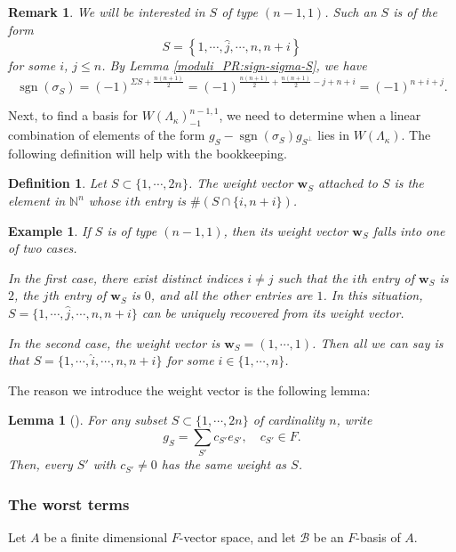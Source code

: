 \documentclass[pdflatex,sn-mathphys-num]{sn-jnl}%
\theoremstyle{thmstyleone}%
\newtheorem{lemma}[subsubsection]{Lemma}%
\theoremstyle{thmstyletwo}%
\newtheorem{example}[subsubsection]{Example}%
\newtheorem{remark}[subsubsection]{Remark}%
\numberwithin{equation}{subsection}
\theoremstyle{thmstylethree}%
\newtheorem{definition}[subsubsection]{Definition}%
\newcommand{\BN}{\ensuremath{\mathbb{N}}\xspace}
\newcommand{\CB}{\ensuremath{\mathcal{B}}\xspace}
\DeclareMathOperator{\sgn}{sgn}
\newcommand{\wh}{\widehat}
\begin{document}
		
\begin{remark}\label{equ_ss-setup:sigma-compute}
	We will be interested in $S$ of type $(n-1,1)$. Such an $S$ is of the form
	\[
	S = \left\{1,\cdots, \wh{j}, \cdots, n, n+i\right\}
	\]
	for some $i$, $j \leq n$.  By Lemma \ref{moduli_PR:sign-sigma-S}, we have
	\[
	\sgn(\sigma_S) = (-1)^{\Sigma S+\frac{n(n+1)}{2}} = (-1)^{\frac{n(n+1)}{2} + \frac{n(n+1)} 2 -j + n+i} = (-1)^{n+ i + j }.
	\]
\end{remark}
		
Next, to find a basis for $W(\Lambda_\kappa)_{-1}^{n-1,1}$, we need to determine when a linear combination of elements of the form $g_S-\sgn(\sigma_S)g_{S^\perp}$ lies in $W(\Lambda_\kappa)$. The following definition will help with the bookkeeping.
\begin{definition}
	Let $S \subset \{1,\cdots,2n\}$.  
	The \emph{weight vector $\mathbf{w}_S$} attached to $S$ is the element in $\BN^n$ whose $i$th entry is $\#(S \cap \{i,n+i\})$.
\end{definition}
		
		
\begin{example}\label{equ_ss-setup:possible-weights}
If $S$ is of type $(n-1,1)$, then its weight vector $\mathbf{w}_S$ falls into one of two cases.

In the first case, there exist distinct indices $i\neq j$ such that the $i$th entry of $\mathbf{w}_S$ is $2$, the $j$th entry of $\mathbf{w}_S$ is $0$, and all the other entries are $1$. In this situation,  $S = \{1,\cdots, \wh{j},\cdots, n, n+i\}$ can be uniquely recovered from its weight vector.

In the second case, the weight vector is $\mathbf{w}_S = (1,\cdots,1)$. Then all we can say is that $S = \{1,\cdots, \wh{i}, \cdots, n, n+ i\}$ for some $i \in \{1,\cdots, n\}$.
\end{example}
The reason we introduce the weight vector is the following lemma:
\begin{lemma}[]\label{equ_ss-setup:weight-compute}
    For any subset $S\subset \{1,\cdots,2n\}$ of cardinality $n$, write
	\[
	g_S=\sum_{S'}c_{S'}e_{S'},\quad c_{S'}\in F.
	\]
Then, every $S'$ with $c_{S'}\neq 0$ has the same weight as $S$. 
\end{lemma}
		
\subsubsection{The worst terms}		
Let $A$ be a finite dimensional $F$-vector space, and let $\CB$ be an $F$-basis of $A$.
		
\end{document}
